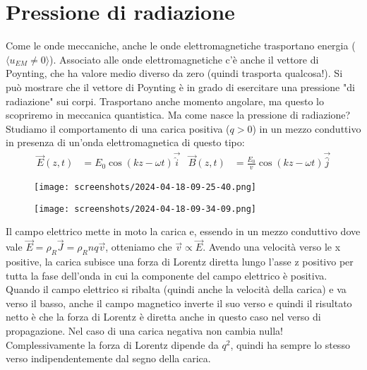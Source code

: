 \section{Pressione di radiazione}
Come le onde meccaniche, anche le onde elettromagnetiche trasportano energia (\(\langle u_{EM} \neq 0 \rangle \)). Associato alle onde elettromagnetiche c'è anche il vettore di Poynting, che ha valore medio diverso da zero (quindi trasporta qualcosa!). Si può mostrare che il vettore di Poynting è in grado di esercitare una pressione "di radiazione" sui corpi. Trasportano anche momento angolare, ma questo lo scopriremo in meccanica quantistica.
Ma come nasce la pressione di radiazione? Studiamo il comportamento di una carica positiva (\(q>0\)) in un mezzo conduttivo in presenza di un'onda elettromagnetica di questo tipo:
\begin{align}
	\vec{E}(z,t)&= E_0 \cos (kz- \omega t) \vec{\hat{i}} & 
	\vec{B}(z,t)&=\frac{E_0}{v} \cos (kz - \omega t) \vec{\hat{j}}
\end{align}
\begin{figure}[H]
	\begin{minipage}[t]{0.3\textwidth}
        \centering
        \texttt{[image: screenshots/2024-04-18-09-25-40.png]}
    \end{minipage}%
	\hfill%
    \begin{minipage}[t]{0.3\textwidth}
        \centering
        \texttt{[image: screenshots/2024-04-18-09-34-09.png]}
    \end{minipage}
\end{figure}
Il campo elettrico mette in moto la carica e, essendo in un mezzo conduttivo dove vale \(\vec{E}=\rho _R \vec{J}=\rho _R n q \vec{v}\), otteniamo che \(\vec{v} \propto \vec{E}\). Avendo una velocità verso le x positive, la carica subisce una forza di Lorentz diretta lungo l'asse z positivo per tutta la fase dell'onda in cui la componente del campo elettrico è positiva. Quando il campo elettrico si ribalta (quindi anche la velocità della carica) e va verso il basso, anche il campo magnetico inverte il suo verso e quindi il risultato netto è che la forza di Lorentz è diretta anche in questo caso nel verso di propagazione. Nel caso di una carica negativa non cambia nulla! Complessivamente la forza di Lorentz dipende da \(q ^{2} \), quindi ha sempre lo stesso verso indipendentemente dal segno della carica.

